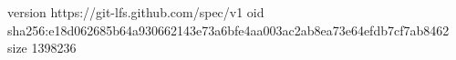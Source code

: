 version https://git-lfs.github.com/spec/v1
oid sha256:e18d062685b64a930662143e73a6bfe4aa003ac2ab8ea73e64efdb7cf7ab8462
size 1398236
